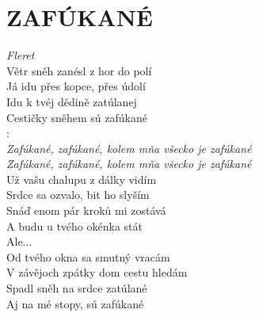 \section*{\Huge ZAFÚKANÉ}
\emph{Fleret}\\

Větr sněh zanésl z hor do polí\\
Já idu přes kopce, přes údolí\\
Idu k tvéj dědině zatúlanej\\
Cestičky sněhem sú zafúkané \hspace{0.6cm}  \hspace{1.7cm}  \hspace{1.1cm} \\

\textregistered:\\
\emph{
Zafúkané, zafúkané, kolem mňa všecko je zafúkané\\
Zafúkané, zafúkané, kolem mňa všecko je zafúkané}\\

Už vašu chalupu z dálky vidím\\
Srdce sa ozvalo, bit ho slyším\\
Snáď enom pár kroků mi zostává\\
A budu u tvého okénka stát\\

Ale... \textregistered\\

Od tvého okna sa smutný vracám\\
V závějoch zpátky dom cestu hledám\\
Spadl sněh na srdce zatúlané\\
Aj na mé stopy, sú zafúkané\\

\textregistered

\newpage
